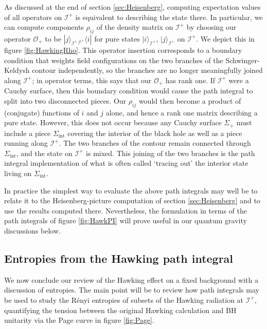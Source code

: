 \documentclass[letterpaper,12pt]{article}
\newcommand*{\scri}{\mathscr{I}} %
\begin{document}
As discussed at the end of section \ref{sec:Heisenberg}, computing expectation values of all operators on $\scri^+$ is equivalent to describing the state there. In particular, we can compute components $\rho_{ij}$ of the density matrix on $\scri^+$ by choosing our operator $\mathcal{O}_+$ to be $|j\rangle_{\scri^+}{}_{\scri^+}\langle i|$ for pure states $|i\rangle_{\scri^+}$, $|j\rangle_{\scri^+}$ on $\scri^+$. We depict this in figure \ref{fig:HawkingRho}. This operator insertion corresponds to a boundary condition that weights field configurations on the two branches of the Schwinger-Keldysh contour  independently, so the branches are no longer meaningfully joined along $\scri^+$; in operator terms, this says that our $\mathcal{O}_+$ has rank one. If $\scri^+$ were a Cauchy surface, then this boundary condition would cause the path integral to split into two disconnected pieces. Our $\rho_{ij}$ would then become a product of (conjugate) functions of $i$ and $j$ alone, and hence a rank one matrix describing a pure state. However, this does not occur because any Cauchy surface $\Sigma_+$ must include a piece $\Sigma_\mathrm{int}$ covering the interior of the black hole as well as a piece running along $\scri^+$. The two branches of the contour remain connected through $\Sigma_\mathrm{int}$, and the state on $\scri^+$ is mixed. This joining of the two branches is the path integral implementation of what is often called `tracing out' the interior state living on $\Sigma_\mathrm{int}$.

In practice the simplest way to evaluate the above path integrals may well be to relate it to the Heisenberg-picture computation of section \ref{sec:Heisenberg} and to use the results computed there.  Nevertheless, the formulation in terms of the path integrals of figure \ref{fig:HawkPI} will prove useful in our quantum gravity discussions below.

\subsection{Entropies from the Hawking path integral}
\label{sec:HawkingEnt}


We now conclude our review of the Hawking effect on a fixed background with a discussion of entropies.  The main point will be to review how path integrals may be used to study the R\'enyi entropies of subsets of the Hawking radiation at $\scri^+$, quantifying the tension between the original Hawking calculation and BH unitarity via the Page curve in figure \ref{fig:Page}.
\end{document}
